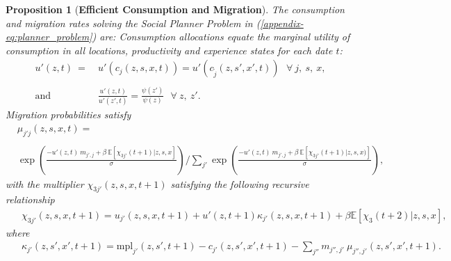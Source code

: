 \documentclass[12pt,pdftex]{article}
\newtheorem{proposition}{Proposition}
\begin{document}
\begin{onehalfspacing}
\begin{proposition}[\textbf{Efficient Consumption and Migration}] \label{apx-prp:efficient} The consumption and migration rates solving the Social Planner Problem in (\ref{appendix-eq:planner_problem}) are: Consumption allocations equate the marginal utility of consumption in all locations, productivity and experience states for each date $t$:
{\small
\begin{align}
u'(z, t) \ = \ & u'(c_{j}(z, s, x, t)) = u'(c_{\tilde{j}}(z, s', x', t)) \ \ \ \forall \ j, \ s, \ x, \\
\label{appendix-eq:foc_planner2}
\nonumber \\
\mbox{and} \ \ \ \ \ \ &\frac{u'(z, t)}{u'(z',t)} = \frac{\psi(z')}{\psi(z)} \ \ \ \forall \ z, \ z'.
\end{align}
}
Migration probabilities satisfy
{\footnotesize
\begin{align}
& \mu_{j'j}(z,s,x,t)  = \nonumber \\
\nonumber \\
& \exp \left(\frac{- u'(z,t) \ m_{j',j} + \beta \ \mathbb{E}\left[\chi_{3j'}(t+1)| z,s,x\right]}{\sigma} \right)  \Bigg / \sum_{j'} \exp \left( \frac{- u'(z, t)\ m_{j',j} + \beta \  \mathbb{E}\left[\chi_{3j'}(t+1)|z,s,x ) \right]}{\sigma} \right), \label{appendix-eq:migration_prob}
\end{align}
}
with the multiplier $\chi_{3j'}(z, s, x, t+1)$ satisfying the following recursive relationship
{\small
\begin{align}
& \ \ \chi_{3j'}(z, s, x, t+1) =  u_{j'}(z, s, x, t+1) +  u'(z, t+1) \kappa_{j'}(z, s,x,t+1) + \beta \mathbb{E}\left[\chi_{3}(t+2)|z, s, x  \right], \label{appendix-eq:dynamic_multiplier}
\end{align}}
where
{\small
\begin{align}
& \ \ \kappa_{j'}(z, s',x',t+1) = \mbox{mpl}_{j'}(z,s',t+1) - c_{j'}(z, s',x',t+1) - \sum_{j''}  m_{j'',j'} \ \mu_{j'',j'}(z, s', x', t+1). \label{appendix-eq:kappa}
\end{align}}
\end{proposition}

\newpage






\end{onehalfspacing}
\end{document}
